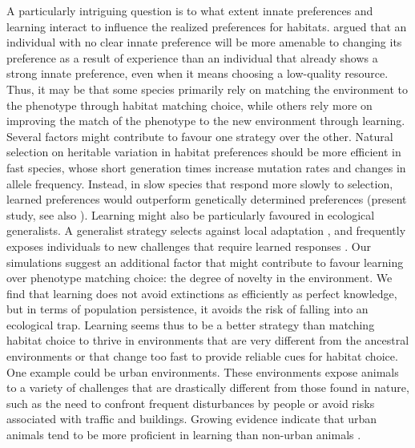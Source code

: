 A particularly intriguing question is to what extent innate
preferences and learning interact to influence the realized
preferences for habitats. \citet{Kawecki2010} argued that an individual
with no clear innate preference will be more amenable to
changing its preference as a result of experience than an individual
that already shows a strong innate preference, even
when it means choosing a low-quality resource. Thus, it
may be that some species primarily rely on matching the
environment to the phenotype through habitat matching
choice, while others rely more on improving the match of the
phenotype to the new environment through learning. Several
factors might contribute to favour one strategy over the other.
Natural selection on heritable variation in habitat preferences
should be more efficient in fast species, whose short generation
times increase mutation rates and changes in allele
frequency. Instead, in slow species that respond more
slowly to selection, learned preferences would outperform
genetically determined preferences (present study, see also \citet{Kokko2001}
). Learning might also be particularly favoured in ecological
generalists. A generalist strategy selects against local
adaptation \citep{Kisdi2002}, and frequently exposes individuals to new
challenges that require learned responses \citep{Sol2016a, Ducatez2015}. Our
simulations suggest an additional factor that might contribute to
favour learning over phenotype matching choice: the degree
of novelty in the environment. We find that learning does
not avoid extinctions as efficiently as perfect knowledge,
but in terms of population persistence, it avoids the risk of
falling into an ecological trap. Learning seems thus to be a
better strategy than matching habitat choice to thrive in
environments that are very different from the ancestral
environments or that change too fast to provide reliable
cues for habitat choice. One example could be urban environments.
These environments expose animals to a variety of
challenges that are drastically different from those found in
nature, such as the need to confront frequent disturbances
by people or avoid risks associated with traffic and buildings.
Growing evidence indicate that urban animals tend to be
more proficient in learning than non-urban animals \citep{Sol2013a}.

